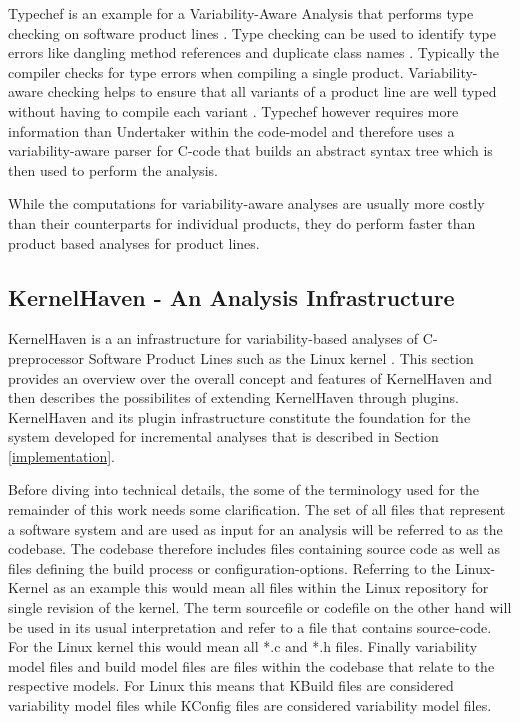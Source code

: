 \documentclass[a4paper]{article}
\begin{document}
Typechef is an example for a Variability-Aware Analysis that performs type checking on software product lines \cite{Dietrich:2012:RAV:2362536.2362544}. Type checking can be used to identify type errors like dangling method references and duplicate class names \cite{Thum:2014:CSA:2620784.2580950}. Typically the compiler checks for type errors when compiling a single product.  Variability-aware  checking helps to ensure that all variants of a product line are well typed without having to compile each variant \cite{Kenner:2010:TTT:1868688.1868693}. Typechef however requires more information than Undertaker within the code-model and therefore uses a variability-aware parser for C-code that builds an abstract syntax tree which is then used to perform the analysis.

While the computations for variability-aware analyses are usually more costly than their counterparts for individual products, they do perform faster than product based analyses for product lines.

\newpage
\subsection{KernelHaven - An Analysis Infrastructure}\label{kernelhaven}

KernelHaven is a an infrastructure for variability-based analyses of C-preprocessor Software Product Lines such as the Linux kernel \cite{KroeherEl-SharkawySchmid18}. This section  provides an overview over the overall concept and features of KernelHaven and then describes the possibilites of extending KernelHaven through plugins. KernelHaven and its plugin infrastructure constitute the foundation for the system developed for incremental analyses that is described in Section \ref{implementation}. 

Before diving into technical details, the some of the terminology used for the remainder of this work needs some clarification. The set of all files  that represent a software system and are used as input for an analysis will be referred to as the codebase. The codebase therefore includes files containing source code as well as files defining the build process or configuration-options. Referring to the Linux-Kernel as an example this would mean all files within the Linux repository for single revision of the kernel.
The term sourcefile or codefile on the other hand will be used in its usual interpretation and refer to a file that contains source-code. For the Linux kernel this would mean all *.c and *.h files. Finally variability model files and build model files are files within the codebase that relate to the respective models. For Linux this means that KBuild files are considered variability model files while  KConfig files are considered variability model files.
\end{document}
